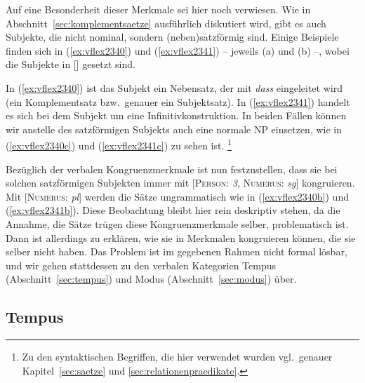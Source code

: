 Auf eine Besonderheit dieser Merkmale sei hier noch verwiesen.
Wie in Abschnitt~\ref{sec:komplementsaetze} ausführlich diskutiert wird, gibt es auch Subjekte, die nicht nominal, sondern (neben)satzförmig sind.
Einige Beispiele finden sich in (\ref{ex:vflex2340}) und (\ref{ex:vflex2341}) -- jeweils (a) und (b) --, wobei die Subjekte in [] gesetzt sind.

\begin{exe}
  \ex\label{ex:vflex2340}
  \begin{xlist}
  \end{xlist}
  \ex\label{ex:vflex2341}
  \begin{xlist}
  \end{xlist}
\end{exe}

In (\ref{ex:vflex2340}) ist das Subjekt ein Nebensatz, der mit \textit{dass} eingeleitet wird (ein Komplementsatz bzw.\ genauer ein Subjektsatz).
In (\ref{ex:vflex2341}) handelt es sich bei dem Subjekt um eine Infinitivkonstruktion.
In beiden Fällen können wir anstelle des satzförmigen Subjekts auch eine normale NP einsetzen, wie in (\ref{ex:vflex2340c}) und (\ref{ex:vflex2341c}) zu sehen ist.%
\footnote{Zu den syntaktischen Begriffen, die hier verwendet wurden vgl.\ genauer Kapitel~\ref{sec:saetze} und \ref{sec:relationenpraedikate}.}

Bezüglich der verbalen Kongruenzmerkmale ist nun festzustellen, dass sie bei solchen satzförmigen Subjekten immer mit [\textsc{Person}: \textit{3}, \textsc{Numerus}: \textit{sg}] kongruieren.
Mit [\textsc{Numerus}: \textit{pl}] werden die Sätze ungrammatisch wie in (\ref{ex:vflex2340b}) und (\ref{ex:vflex2341b}).
Diese Beobachtung bleibt hier rein deskriptiv stehen, da die Annahme, die Sätze trügen diese Kongruenzmerkmale selber, problematisch ist.
Dann ist allerdings zu erklären, wie sie in Merkmalen kongruieren können, die sie selber nicht haben.
Das Problem ist im gegebenen Rahmen nicht formal lösbar, und wir gehen stattdessen zu den verbalen Kategorien Tempus (Abschnitt~\ref{sec:tempus}) und Modus (Abschnitt~\ref{sec:modus}) über.

\subsection{Tempus}


